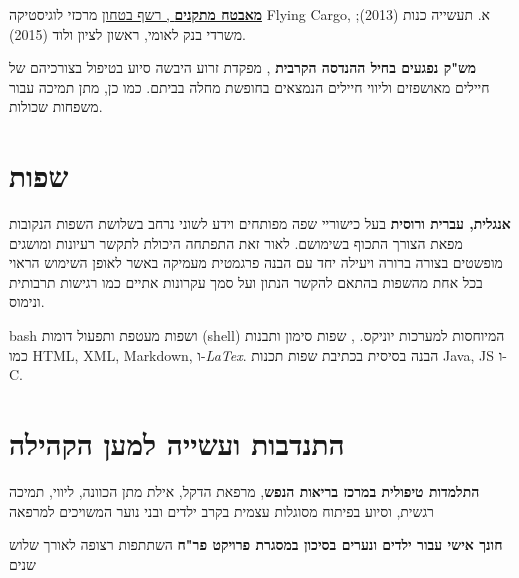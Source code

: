 {\href{https://www.dropbox.com/s/kr5rcui1zgp35i0/recommendation-letter-security-guard.jpg?dl=0}{\textbf{מאבטח מתקנים} , רשף בטחון}}
{מרכזי לוגיסטיקה Flying Cargo, א. תעשייה כנות (2013); משרדי בנק לאומי, ראשון לציון ולוד (2015).}
{}

{\textbf{מש"ק נפגעים בחיל ההנדסה הקרבית} , מפקדת זרוע היבשה}
{סיוע בטיפול בצורכיהם של חיילים מאושפזים וליווי חיילים הנמצאים בחופשת מחלה בביתם. כמו כן, מתן תמיכה עבור משפחות שכולות.}
{}

\section{שפות}

{\textbf{אנגלית, עברית ורוסית}}
{בעל כישוריי שפה מפותחים וידע לשוני נרחב בשלושת השפות הנקובות מפאת הצורך התכוף בשימושם. לאור זאת התפתחה היכולת לתקשר רעיונות ומושגים מופשטים בצורה ברורה ויעילה יחד עם הבנה פרגמטית מעמיקה באשר לאופן השימוש הראוי בכל אחת מהשפות בהתאם להקשר הנתון ועל סמך עקרונות אתיים כמו רגישות תרבותית ונימוס.} 
{}

{bash
ושפות מעטפת ותפעול דומות (shell) המיוחסות למערכות יוניקס.
, שפות סימון ותבנות כמו HTML, XML, Markdown, ו-\textit{LaTex}.
הבנה בסיסית בכתיבת שפות תכנות Java, JS ו-C.}
{}{}

\section{התנדבות ועשייה למען הקהילה}

{\textbf{התלמדות טיפולית במרכז בריאות הנפש}, מרפאת הדקל, אילת}
{מתן הכוונה, ליווי, תמיכה רגשית, וסיוע בפיתוח מסוגלות עצמית בקרב ילדים ובני נוער המשויכים למרפאה}
{}

{\textbf{חונך אישי עבור ילדים ונערים בסיכון במסגרת פרויקט פר"ח}}
{השתתפות רצופה לאורך שלוש שנים}
{}		
\unsetRTL
